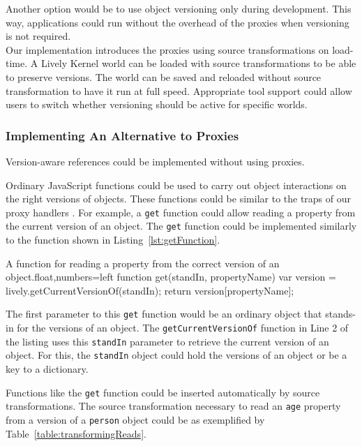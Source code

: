 Another option would be to use object versioning only during development.
This way, applications could run without the overhead of the proxies when versioning is not required.\\
Our implementation introduces the proxies using source transformations on load-time.
A Lively Kernel world can be loaded with source transformations to be able to preserve versions.
The world can be saved and reloaded without source transformation to have it run at full speed.
Appropriate tool support could allow users to switch whether versioning should be active for specific worlds.


\subsubsection{Implementing An Alternative to Proxies}

Version-aware references could be implemented without using proxies.

Ordinary JavaScript functions could be used to carry out object interactions on the right versions of objects.
These functions could be similar to the traps of our proxy handlers .
For example, a \lstinline{get} function could allow reading a property from the current version of an object.
The \lstinline{get} function could be implemented similarly to the function shown in Listing~\ref{lst:getFunction}.

\iffalse
\begin{verbatim}\fi
\begin{code}{A function for reading a property from the correct version of an object.}{float,numbers=left}
function get(standIn, propertyName) {
    var version = lively.getCurrentVersionOf(standIn);
    return version[propertyName];
}
\end{code}
\iffalse
\end{verbatim}\fi

The first parameter to this \lstinline{get} function would be an ordinary object that stands-in for the versions of an object.
The \lstinline{getCurrentVersionOf} function in Line 2 of the listing uses this \lstinline{standIn} parameter to retrieve the current version of an object.
For this, the \lstinline{standIn} object could hold the versions of an object or be a key to a dictionary.

Functions like the \lstinline{get} function could be inserted automatically by source transformations.
The source transformation necessary to read an \lstinline{age} property from a version of a \lstinline{person} object could be as exemplified by Table~\ref{table:transformingReads}.

